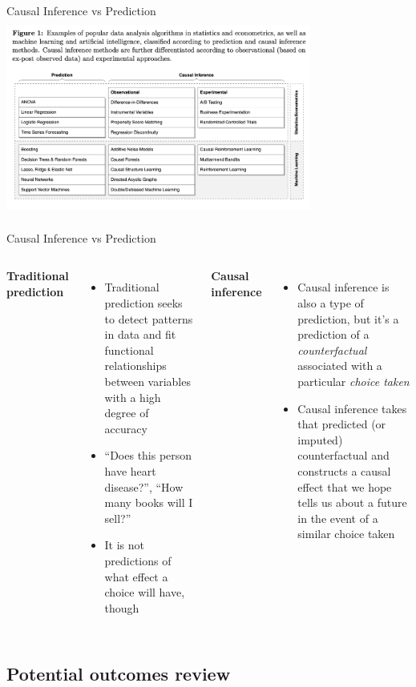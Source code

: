 \documentclass{beamer}
\begin{document}
\begin{frame}{Causal Inference vs Prediction}
  \centering
  \includegraphics[scale=0.5,height=6.5cm, width=10cm]{./lecture_includes/prediction_causality.png}
\end{frame}

\begin{frame}{Causal Inference vs Prediction}

  \begin{columns}
    \centering
    \textbf{Traditional prediction}
    \begin{itemize}
      \item Traditional prediction seeks to detect patterns in data and fit functional relationships between variables with a high degree of accuracy
      \item ``Does this person have heart disease?'', ``How many books will I sell?''
      \item It is not predictions of what effect a choice will have, though
    \end{itemize}
    \centering
    \textbf{Causal inference}
    \begin{itemize}
      \item Causal inference is also a type of prediction, but it's a prediction of a \emph{counterfactual} associated with a particular \emph{choice taken}
      \item Causal inference takes that predicted (or imputed) counterfactual and constructs a causal effect that we hope tells us about a future in the event of a similar choice taken
    \end{itemize}
  \end{columns}
\end{frame}


\subsection{Potential outcomes review}
\end{document}
